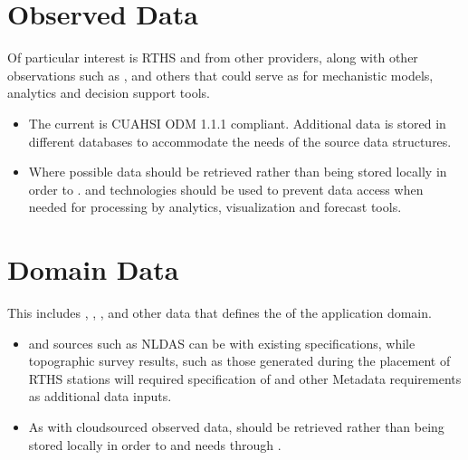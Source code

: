 \documentclass[letterpaper,12pt,english]{sphinxmanual}
\begin{document}
\section{Observed Data}
\label{\detokenize{requirements/data/observed:observed-data}}\label{\detokenize{requirements/data/observed::doc}}
\sphinxAtStartPar
Of particular interest is RTHS and  from other providers, along with other observations such as ,  and others that could serve as  for mechanistic models, analytics and decision support tools.
\begin{itemize}
\item {} 
\sphinxAtStartPar
The current  is CUAHSI ODM 1.1.1 compliant. Additional data is stored in different databases to accommodate the needs of the source data structures.

\item {} 
\sphinxAtStartPar
Where possible  data should be retrieved  rather than being stored locally in order to .  and  technologies should be used to prevent data access  when needed for processing by analytics, visualization and forecast tools.

\end{itemize}


\section{Domain Data}
\label{\detokenize{requirements/data/domain:domain-data}}\label{\detokenize{requirements/data/domain::doc}}
\sphinxAtStartPar
This includes , , ,
 and other data that defines the  of the
application domain.
\begin{itemize}
\item {} 
\sphinxAtStartPar
{} and  sources such as NLDAS can be  with existing  specifications, while topographic survey results, such as those generated during the placement of RTHS stations will required specification of  and other Metadata requirements as additional data inputs.

\item {} 
\sphinxAtStartPar
As with cloud\sphinxhyphen{}sourced observed data,  should be retrieved  rather than being stored locally in order to  and  needs through .

\end{itemize}
\end{document}
